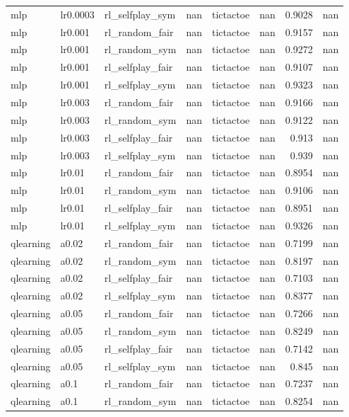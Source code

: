 \begin{table}[t]
\begin{tabular}{lllrrrrr}
mlp & lr0.0003 & rl\_selfplay\_sym & nan & tictactoe & nan & 0.9028 & nan \\
mlp & lr0.001 & rl\_random\_fair & nan & tictactoe & nan & 0.9157 & nan \\
mlp & lr0.001 & rl\_random\_sym & nan & tictactoe & nan & 0.9272 & nan \\
mlp & lr0.001 & rl\_selfplay\_fair & nan & tictactoe & nan & 0.9107 & nan \\
mlp & lr0.001 & rl\_selfplay\_sym & nan & tictactoe & nan & 0.9323 & nan \\
mlp & lr0.003 & rl\_random\_fair & nan & tictactoe & nan & 0.9166 & nan \\
mlp & lr0.003 & rl\_random\_sym & nan & tictactoe & nan & 0.9122 & nan \\
mlp & lr0.003 & rl\_selfplay\_fair & nan & tictactoe & nan & 0.913 & nan \\
mlp & lr0.003 & rl\_selfplay\_sym & nan & tictactoe & nan & 0.939 & nan \\
mlp & lr0.01 & rl\_random\_fair & nan & tictactoe & nan & 0.8954 & nan \\
mlp & lr0.01 & rl\_random\_sym & nan & tictactoe & nan & 0.9106 & nan \\
mlp & lr0.01 & rl\_selfplay\_fair & nan & tictactoe & nan & 0.8951 & nan \\
mlp & lr0.01 & rl\_selfplay\_sym & nan & tictactoe & nan & 0.9326 & nan \\
qlearning & a0.02 & rl\_random\_fair & nan & tictactoe & nan & 0.7199 & nan \\
qlearning & a0.02 & rl\_random\_sym & nan & tictactoe & nan & 0.8197 & nan \\
qlearning & a0.02 & rl\_selfplay\_fair & nan & tictactoe & nan & 0.7103 & nan \\
qlearning & a0.02 & rl\_selfplay\_sym & nan & tictactoe & nan & 0.8377 & nan \\
qlearning & a0.05 & rl\_random\_fair & nan & tictactoe & nan & 0.7266 & nan \\
qlearning & a0.05 & rl\_random\_sym & nan & tictactoe & nan & 0.8249 & nan \\
qlearning & a0.05 & rl\_selfplay\_fair & nan & tictactoe & nan & 0.7142 & nan \\
qlearning & a0.05 & rl\_selfplay\_sym & nan & tictactoe & nan & 0.845 & nan \\
qlearning & a0.1 & rl\_random\_fair & nan & tictactoe & nan & 0.7237 & nan \\
qlearning & a0.1 & rl\_random\_sym & nan & tictactoe & nan & 0.8254 & nan \\

\end{tabular}
\end{table}
